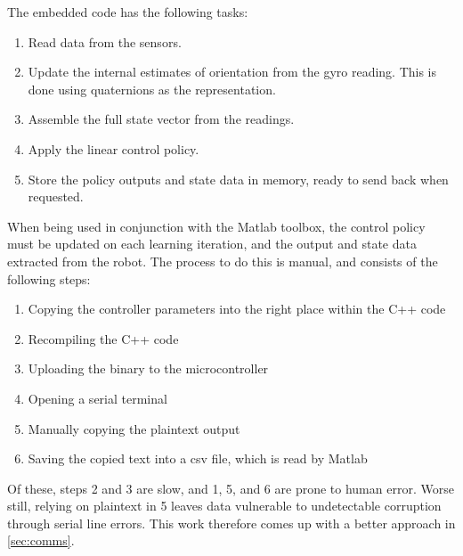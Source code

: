 \documentclass[main.tex]{subfiles}
\begin{document}
	The embedded code has the following tasks:
	\begin{enumerate}[noitemsep]
		\item Read data from the sensors.
		\item
			Update the internal estimates of orientation from the gyro reading.
			This is done using quaternions as the representation.
		\item Assemble the full state vector from the readings.
		\item Apply the linear control policy.
		\item Store the policy outputs and state data in memory, ready to send back when requested.
	\end{enumerate}
	When being used in conjunction with the Matlab toolbox, the control policy must be updated on each learning iteration, and the output and state data extracted from the robot.
	The process to do this is manual, and consists of the following steps:
	\begin{enumerate}[noitemsep]
		\item Copying the controller parameters into the right place within the C++ code
		\item Recompiling the C++ code
		\item Uploading the binary to the microcontroller
		\item Opening a serial terminal
		\item Manually copying the plaintext output
		\item Saving the copied text into a csv file, which is read by Matlab
	\end{enumerate}
	Of these, steps 2 and 3 are slow, and 1, 5, and 6 are prone to human error.
	Worse still, relying on plaintext in 5 leaves data vulnerable to undetectable corruption through serial line errors\footnotemark. This work therefore comes up with a better approach in \cref{sec:comms}.

\end{document}

